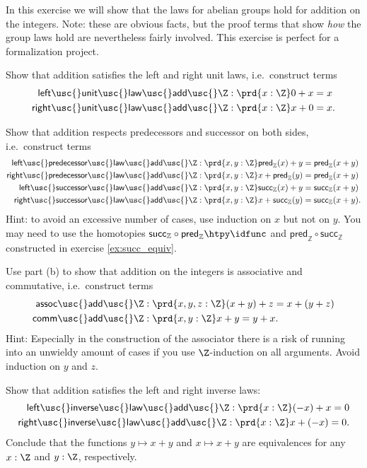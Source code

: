 \begin{exercises}
\item \label{ex:int_group_laws} In this exercise we will show that the laws for abelian groups hold for addition on the integers. Note: these are obvious facts, but the proof terms that show \emph{how} the group laws hold are nevertheless fairly involved. This exercise is perfect for a formalization project. 
\begin{subexenum}
\item Show that addition satisfies the left and right unit laws, i.e.~construct terms
\begin{align*}
\mathsf{left\usc{}unit\usc{}law\usc{}add\usc{}}\Z  & : \prd{x:\Z} 0 + x = x \\
\mathsf{right\usc{}unit\usc{}law\usc{}add\usc{}}\Z  & : \prd{x : \Z} x + 0 = x.
\end{align*}
\item Show that addition respects predecessors and successor on both sides, i.e.~construct terms
\begin{align*}
\mathsf{left\usc{}predecessor\usc{}law\usc{}add\usc{}}\Z & : \prd{x,y:\Z} \mathsf{pred}_{\mathbb{Z}}(x)+y = \mathsf{pred}_{\mathbb{Z}}(x+y) \\
\mathsf{right\usc{}predecessor\usc{}law\usc{}add\usc{}}\Z & : \prd{x,y:\Z} x+\mathsf{pred}_{\mathbb{Z}}(y) = \mathsf{pred}_{\mathbb{Z}}(x+y) \\
\mathsf{left\usc{}successor\usc{}law\usc{}add\usc{}}\Z & : \prd{x,y:\Z} \mathsf{succ}_{\mathbb{Z}}(x)+y = \mathsf{succ}_{\mathbb{Z}}(x+y) \\
\mathsf{right\usc{}successor\usc{}law\usc{}add\usc{}}\Z & : \prd{x,y:\Z} x+\mathsf{succ}_{\mathbb{Z}}(y) = \mathsf{succ}_{\mathbb{Z}}(x+y).
\end{align*}
Hint: to avoid an excessive number of cases, use induction on $x$ but not on $y$. You may need to use the homotopies $\mathsf{succ}_{\mathbb{Z}}\circ \mathsf{pred}_{\mathbb{Z}}\htpy \idfunc$ and $\mathsf{pred}_{\mathbb{Z}}\circ\mathsf{succ}_{\mathbb{Z}}$ constructed in exercise \cref{ex:succ_equiv}.
\item Use part (b) to show that addition on the integers is associative and commutative, i.e.~construct terms
\begin{align*}
\mathsf{assoc\usc{}add\usc{}}\Z & : \prd{x,y,z:\Z} (x+y)+z = x + (y+z) \\
\mathsf{comm\usc{}add\usc{}}\Z & : \prd{x,y:\Z} x+y = y+x.
\end{align*}
Hint: Especially in the construction of the associator there is a risk of running into an unwieldy amount of cases if you use $\Z$-induction on all arguments. Avoid induction on $y$ and $z$.
\item Show that addition satisfies the left and right inverse laws:
\begin{align*}
\mathsf{left\usc{}inverse\usc{}law\usc{}add\usc{}}\Z : \prd{x : \Z} (-x)+x=0 \\
\mathsf{right\usc{}inverse\usc{}law\usc{}add\usc{}}\Z : \prd{x : \Z} x + (-x)=0.
\end{align*}
Conclude that the functions $y \mapsto x + y$ and $x\mapsto x + y$ are equivalences for any $x:\Z$ and $y:\Z$, respectively.
\end{subexenum}
\end{exercises}
